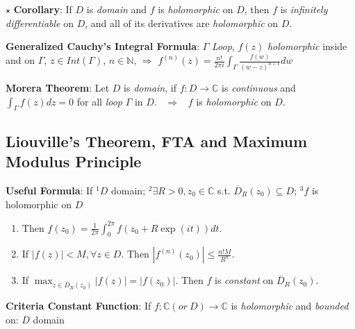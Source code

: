 \documentclass[9pt]{article}
\begin{document}
\quad $\star$   \textbf{Corollary}: {\small If $D$ is \textit{domain} and $f$ is \textit{holomorphic} on $D$, then $f$ is \textit{infinitely differentiable} on $D$, and all of its derivatives are \textit{holomorphic} on $D$.}

\textbf{Generalized Cauchy's Integral Formula}: {\footnotesize $\Gamma$ \textit{Loop}, $f(z)$ \textit{holomorphic} inside and on $\Gamma$, $z\in Int(\Gamma)$, $n\in\mathbb{N}$,} \quad $\Rightarrow$ \quad $f^{(n)}(z)=\frac{n!}{2\pi i}\int_{\Gamma}\frac{f(w)}{(w-z)^{n+1}}dw$


\textbf{Morera Theorem}: Let $D$ is \textit{domain}, if $f:D\to\mathbb{C}$ is \textit{continuous} and $\int_{\Gamma}f(z)dz=0$ for all \textit{loop} $\Gamma$ in $D$. \ $\Rightarrow$ \ $f$ is \textit{holomorphic} on $D$.


\subsection{Liouville's Theorem, FTA and Maximum Modulus Principle} %

\textbf{Useful Formula}: If $^1D$ domain; $^2\exists R>0,z_0\in\mathbb{C}$ s.t. $\overline{D}_{R}(z_0)\subseteq D$; $^3f$ is holomorphic on $D$

\begin{enumerate}[itemsep=-2pt, topsep=-2pt]
    \item Then $f(z_0)=\frac{1}{2\pi}\int_0^{2\pi}f(z_0+R\exp(it))dt$.
    \item If $|f(z)|<M,\forall z\in D$. Then $|f^{(n)}(z_0)|\leq\frac{n!M}{R^n}$.
    \item If $\max_{{z\in}\overline{D}_{R}(z_0)}|f(z)|=|f(z_0)|$. Then $f$ is \textit{constant} on $\overline{D}_{R}(z_0)$.
\end{enumerate}

\textbf{Criteria Constant Function}: If $f:\mathbb{C}(or \ D)\to\mathbb{C}$ is \textit{holomorphic} and \textit{bounded} on: \qquad\qquad $D$ domain
\end{document}
